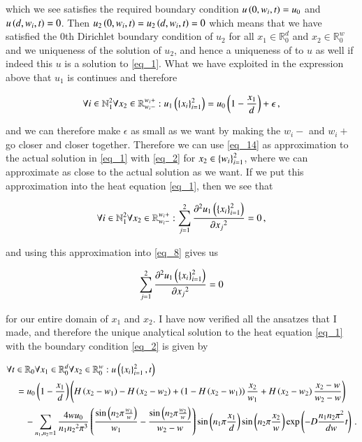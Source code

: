 \documentclass[11pt,english,a4paper]{article}
\begin{document}
\begin{flushleft}
which we see satisfies the required boundary condition $u\left({0,w_i,t}\right) = u_0$ and $u\left({d,w_i,t}\right)=0$. Then  $u_2\left({0,w_i,t}\right)=u_2\left({d,w_i,t}\right)=0$ which means that we have satisfied the 0th Dirichlet boundary condition of $u_2$ for all $x_1\in\mathbb{R}_0^d$ and $x_2\in\mathbb{R}_0^w$ and we uniqueness of the solution of $u_2$, and hence a uniqueness of to $u$ as well if indeed this $u$ is a solution to \eqref{eq_1}. What we have exploited in the expression above that $u_1$ is continues and therefore 

\begin{align*}
\forall i \in \mathbb{N}_1^2 \forall x_2\in\mathbb{R}_{w_i-}^{w_i +} : u_1\left({\left\lbrace{x_i}\right\rbrace_{i=1}^2}\right) = u_0\left({1-\frac{x_1}{d}}\right) + \epsilon\,,
\end{align*}

and we can therefore make $\epsilon$ as small as we want by making the $w_i-$ and $w_i+$ go closer and closer together. Therefore we can use \eqref{eq_14} as approximation to the actual solution in \eqref{eq_1} with \eqref{eq_2} for $x_2\in\left\lbrace{w_i}\right\rbrace_{i=1}^2$, where we can approximate as close to the actual solution as we want. If we put this approximation into the heat equation \eqref{eq_1}, then we see that

\begin{align*}
\forall i \in \mathbb{N}_1^2 \forall x_2\in\mathbb{R}_{w_i-}^{w_i +} :\sum_{j=1}^2 \frac{\partial^2 u_1\left({\left\lbrace{x_i}\right\rbrace_{i=1}^2}\right)}{\partial {x_j}^2} = 0 \,,
\end{align*}

and using this approximation into \eqref{eq_8} gives us

\begin{align*}
\sum_{j=1}^2 \frac{\partial^2 u_1\left({\left\lbrace{x_i}\right\rbrace_{i=1}^2}\right)}{\partial {x_j}^2} = 0
\end{align*}

for our entire domain of $x_1$ and $x_2$. I have now verified all the ansatzes that I made, and therefore the unique analytical solution to the heat equation \eqref{eq_1} with the boundary condition \eqref{eq_2} is given by

\begin{align}
&\forall t\in \mathbb{R}_0 \forall x_1 \in \mathbb{R}_0^d \forall x_2 \in \mathbb{R}_0^w : u\left({\left\lbrace{x_i}\right\rbrace_{i=1}^2,t}\right) 
\\&\quad = u_0\left({1-\frac{x_1}{d}}\right)\left({H\left({x_2-w_1}\right)-H\left({x_2-w_2}\right) + \left({1-H\left({x_2-w_1}\right)}\right)\frac{x_2}{w_1} + H\left({x_2-w_2}\right)\frac{x_2-w}{w_2-w}}\right) 
\nonumber\\
&\qquad -\sum_{n_1,n_2=1} \frac{4 w u_0}{n_1 {n_2}^2 \pi^3}\left({\frac{\sin\left({n_2 \pi \frac{w_1}{w}}\right)}{w_1}-\frac{\sin\left({n_2 \pi \frac{w_2}{w}}\right)}{w_2-w}}\right)\sin\left({n_1\pi \frac{x_1}{d}}\right) \sin\left({n_2\pi \frac{x_2}{w}}\right) \exp\left({-D\frac{n_1 n_2 \pi^2}{dw} t}\right)\,.
\nonumber
\end{align}



\end{flushleft}
\end{document}
